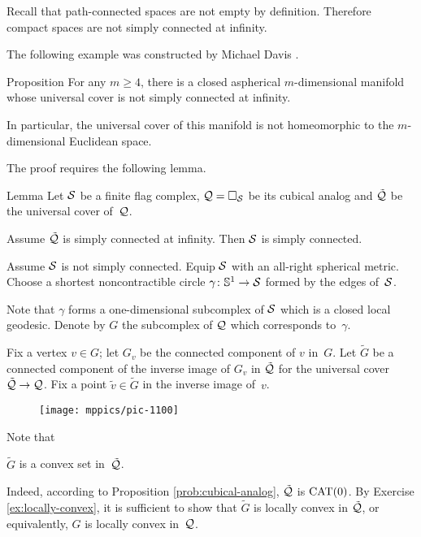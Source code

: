 Recall that path-connected spaces are not empty by definition.
Therefore compact spaces are not simply connected at infinity.

The following example was constructed by Michael Davis \cite{davis-1983}.

\begin{thm}{Proposition}\label{prop:aspherical}
For any $m\ge 4$, there is a closed aspherical $m$-dimensional manifold whose universal cover is not simply connected at infinity.

In particular, the universal cover of this manifold 
is not homeomorphic to the $m$-dimensional Euclidean space.
\end{thm}

The proof requires the following lemma.

\begin{thm}{Lemma}\label{lem:example-pi_infty}
Let $\mathcal{S}$ be a finite flag complex,
$\mathcal{Q}=\square_{\mathcal{S}}$ be its cubical analog
and $\tilde{\mathcal{Q}}$ be the universal cover of~$\mathcal{Q}$.

Assume  $\tilde{\mathcal{Q}}$ is simply connected at infinity.
Then $\mathcal{S}$ is simply connected.
\end{thm}

Assume $\mathcal{S}$ is not simply connected. Equip $\mathcal{S}$ with an all-right spherical metric.
Choose a shortest noncontractible circle $\gamma\colon\mathbb{S}^1\to\mathcal{S}$ formed by the edges of~$\mathcal{S}$.

Note that $\gamma$ forms a one-dimensional subcomplex of $\mathcal{S}$ which is a closed local geodesic.
Denote by $G$ the subcomplex of $\mathcal{Q}$ which corresponds to~$\gamma$.

Fix a vertex $v\in G$;
let $G_v$ be the connected component of $v$ in~$G$.
Let $\tilde G$ be a connected component of the inverse image of $G_v$ in $\tilde{\mathcal{Q}}$
for the universal cover $\tilde{\mathcal{Q}}\to \mathcal{Q}$.
Fix a point $\tilde v\in\tilde G$ in the inverse image of~$v$.

\begin{wrapfigure}{r}{25mm}
\vskip0mm
\centering
\texttt{[image: mppics/pic-1100]}
\end{wrapfigure}
 
Note that 
\begin{clm}{}\label{tilde-G-convex}
$\tilde G$ is a convex set in~$\tilde{\mathcal{Q}}$.
\end{clm}


Indeed, according to Proposition \ref{prob:cubical-analog},
$\tilde{\mathcal{Q}}$ is $\mathrm{CAT}(0)$.
By Exercise \ref{ex:locally-convex},
it is sufficient to show that $\tilde G$ is locally convex in $\tilde{\mathcal{Q}}$,
or equivalently, $G$ is locally convex in~$\mathcal{Q}$.

